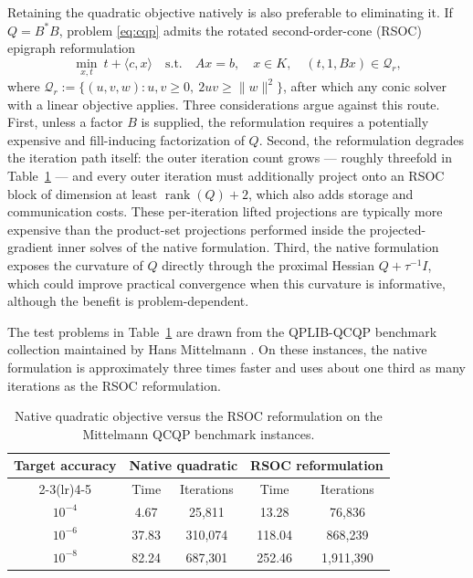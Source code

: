 \documentclass[letterpaper]{article} %
\theoremstyle{definition}
\theoremstyle{remark}
\newcommand{\papertablesetup}{\small\setstretch{1.0}\renewcommand{\arraystretch}{1.2}}
\begin{document}
Retaining the quadratic objective natively is also preferable to
eliminating it.  If $Q=B^*B$, problem \eqref{eq:cqp} admits the rotated
second-order-cone (RSOC) epigraph reformulation
\[
    \min_{x,t}\ t+\langle c,x\rangle
    \quad\mathrm{s.t.}\quad
    Ax=b,\quad x\in K,\quad (t,1,Bx)\in\mathcal Q_r,
\]
where
$\mathcal Q_r:=\{(u,v,w):u,v\ge0,\ 2uv\ge\|w\|^2\}$, after which any conic
solver with a linear objective applies.  Three considerations argue against
this route.  First, unless a factor $B$ is supplied, the reformulation
requires a potentially expensive and fill-inducing factorization of $Q$.
Second, the reformulation degrades the iteration path itself: the outer
iteration count grows --- roughly threefold in
Table~\ref{tab:native-q-vs-rsoc} --- and every outer iteration must
additionally project onto an RSOC block of dimension at least
$\operatorname{rank}(Q)+2$, which also adds storage and communication
costs.  These per-iteration lifted projections are typically more expensive
than the product-set projections performed inside the projected-gradient
inner solves of the native formulation. Third, the native formulation exposes the curvature of
$Q$ directly through the proximal Hessian $Q+\tau^{-1}I$, which could
improve practical convergence when this curvature is informative, although
the benefit is problem-dependent.

The test problems in Table~\ref{tab:native-q-vs-rsoc} are drawn from the
QPLIB-QCQP benchmark collection maintained by Hans Mittelmann
\cite{mittelmann2021decision}.  On these instances, the native formulation
is approximately three times faster and uses about one third as many
iterations as the RSOC reformulation.
\begin{table}[htbp]
    \centering
    \papertablesetup
    \caption{Native quadratic objective versus the RSOC reformulation
    on the Mittelmann QCQP benchmark instances.}
    \label{tab:native-q-vs-rsoc}
    \medskip
    \begin{tabular}{ccccc}
        \toprule
        \multirow{2}{*}{Target accuracy}
        & \multicolumn{2}{c}{Native quadratic}
        & \multicolumn{2}{c}{RSOC reformulation}\\
        \cmidrule(lr){2-3}\cmidrule(lr){4-5}
        & Time & Iterations & Time & Iterations\\
        \midrule
        $10^{-4}$ & 4.67  & 25,811  & 13.28  & 76,836\\
        $10^{-6}$ & 37.83 & 310,074 & 118.04 & 868,239\\
        $10^{-8}$ & 82.24 & 687,301 & 252.46 & 1,911,390\\
        \bottomrule
    \end{tabular}
\end{table}
\end{document}
